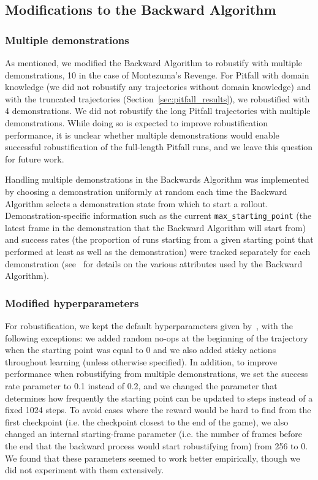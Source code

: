 \documentclass{article}
\begin{document}
\FloatBarrier


\subsection{Modifications to the Backward Algorithm}
\label{sec:backward_mods}

\subsubsection{Multiple demonstrations}

As mentioned, we modified the Backward Algorithm to robustify with multiple demonstrations, 10 in the case of Montezuma's Revenge. For Pitfall with domain knowledge (we did not robustify any trajectories without domain knowledge) and with the truncated trajectories (Section~\ref{sec:pitfall_results}), we robustified with 4 demonstrations. We did not robustify the long Pitfall trajectories with multiple demonstrations. While doing so is expected to improve robustification performance, it is unclear whether multiple demonstrations would enable successful robustification of the full-length Pitfall runs, and we leave this question for future work.

Handling multiple demonstrations in the Backwards Algorithm was implemented by choosing a demonstration uniformly at random each time the Backward Algorithm selects a demonstration state from which to start a rollout. Demonstration-specific information such as the current \texttt{max\_starting\_point} (the latest frame in the demonstration that the Backward Algorithm will start from) and success rates (the proportion of runs starting from a given starting point that performed at least as well as the demonstration) were tracked separately for each demonstration (see~\citet{salimans2018learning} for details on the various attributes used by the Backward Algorithm).

\subsubsection{Modified hyperparameters}

For robustification, we kept the default hyperparameters given by~\citet{salimans2018learning}, with the following exceptions: we added random no-ops at the beginning of the trajectory when the starting point was equal to 0 and we also added sticky actions throughout learning (unless otherwise specified). In addition, to improve performance when robustifying from multiple demonstrations, we set the success rate parameter to 0.1 instead of 0.2, and we changed the parameter that determines how frequently the starting point can be updated to  steps instead of a fixed 1024 steps. To avoid cases where the reward would be hard to find from the first checkpoint (i.e. the checkpoint closest to the end of the game), we also changed an internal starting-frame parameter (i.e. the number of frames before the end that the backward process would start robustifying from) from 256 to 0.
We found that these parameters seemed to work better empirically, though we did not experiment with them extensively.
\end{document}
